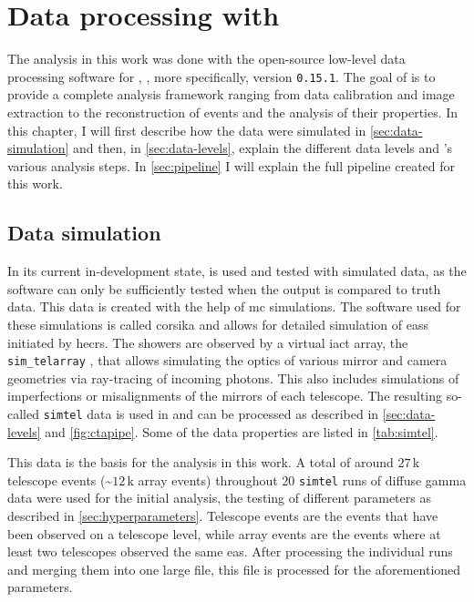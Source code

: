 \chapter{Data processing with \ctapipe{}}
\label{ch:data-processing}

The analysis in this work was done with the open-source low-level data processing software for \cta{},
\ctapipe{} \cite{ctapipe}, more specifically, version \texttt{0.15.1}.
The goal of \ctapipe{} is to provide a complete analysis
framework ranging from data calibration and image extraction to the reconstruction of events and the
analysis of their properties. In this chapter, I will first describe how the data
were simulated in \autoref{sec:data-simulation} and then, in \autoref{sec:data-levels}, explain the different
data levels and \ctapipe{}'s various analysis steps. In \autoref{sec:pipeline} I will
explain the full pipeline created for this work.

\vspace{-0.5cm}
\section{Data simulation}
\label{sec:data-simulation}

In its current in-development state, \ctapipe{} is used and tested with simulated data, as the software
can only be sufficiently tested when the output is compared to truth data. This data is created with the help of
\gls{mc} simulations. The software used for these simulations is called \gls{corsika} \cite{corsika} and
allows for detailed simulation of \glspl{eas} initiated by \glspl{hecr}. The showers are observed by
a virtual \gls{iact} array, the \texttt{sim\_telarray} \cite{bernlohr2008}, that allows simulating the optics
of various mirror and camera geometries via ray-tracing of incoming photons. This also includes
simulations of imperfections or misalignments of the mirrors of each telescope. The resulting so-called
\texttt{simtel} data is used in \ctapipe{} and can be processed as described in \autoref{sec:data-levels}
and \autoref{fig:ctapipe}. Some of the data properties are listed in \autoref{tab:simtel}.

This data is the basis for the analysis in this work. A total of around \(\num{27}\)\,k telescope events
(\sim\(\num{12}\)\,k array events) throughout \(\num{20}\) \texttt{simtel} runs of diffuse gamma data
were used for the initial analysis, \ie the testing of different parameters as described in
\autoref{sec:hyperparameters}. Telescope events are the events that have been observed on a telescope level,
while array events are the events where at least two telescopes observed the same \gls{eas}.
After processing the individual runs and merging them into one large
file, this file is processed for the aforementioned parameters. %

